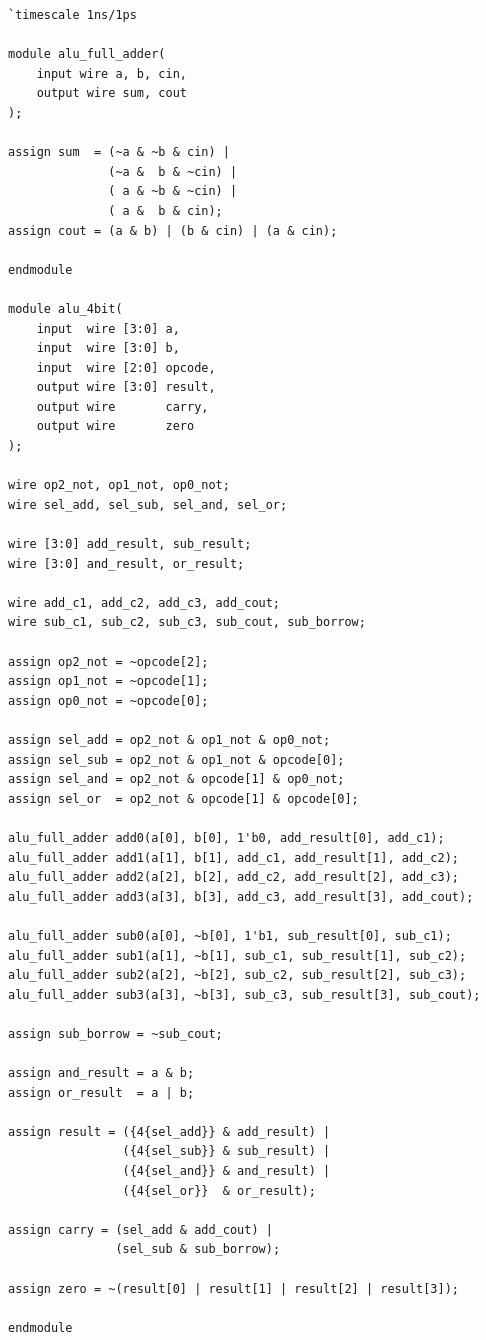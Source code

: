 \documentclass[11pt,a4paper]{article}
\begin{document}
\begin{lstlisting}[caption={Gate-level 4-bit ALU design}]
`timescale 1ns/1ps

module alu_full_adder(
    input wire a, b, cin,
    output wire sum, cout
);

assign sum  = (~a & ~b & cin) |
              (~a &  b & ~cin) |
              ( a & ~b & ~cin) |
              ( a &  b & cin);
assign cout = (a & b) | (b & cin) | (a & cin);

endmodule

module alu_4bit(
    input  wire [3:0] a,
    input  wire [3:0] b,
    input  wire [2:0] opcode,
    output wire [3:0] result,
    output wire       carry,
    output wire       zero
);

wire op2_not, op1_not, op0_not;
wire sel_add, sel_sub, sel_and, sel_or;

wire [3:0] add_result, sub_result;
wire [3:0] and_result, or_result;

wire add_c1, add_c2, add_c3, add_cout;
wire sub_c1, sub_c2, sub_c3, sub_cout, sub_borrow;

assign op2_not = ~opcode[2];
assign op1_not = ~opcode[1];
assign op0_not = ~opcode[0];

assign sel_add = op2_not & op1_not & op0_not;
assign sel_sub = op2_not & op1_not & opcode[0];
assign sel_and = op2_not & opcode[1] & op0_not;
assign sel_or  = op2_not & opcode[1] & opcode[0];

alu_full_adder add0(a[0], b[0], 1'b0, add_result[0], add_c1);
alu_full_adder add1(a[1], b[1], add_c1, add_result[1], add_c2);
alu_full_adder add2(a[2], b[2], add_c2, add_result[2], add_c3);
alu_full_adder add3(a[3], b[3], add_c3, add_result[3], add_cout);

alu_full_adder sub0(a[0], ~b[0], 1'b1, sub_result[0], sub_c1);
alu_full_adder sub1(a[1], ~b[1], sub_c1, sub_result[1], sub_c2);
alu_full_adder sub2(a[2], ~b[2], sub_c2, sub_result[2], sub_c3);
alu_full_adder sub3(a[3], ~b[3], sub_c3, sub_result[3], sub_cout);

assign sub_borrow = ~sub_cout;

assign and_result = a & b;
assign or_result  = a | b;

assign result = ({4{sel_add}} & add_result) |
                ({4{sel_sub}} & sub_result) |
                ({4{sel_and}} & and_result) |
                ({4{sel_or}}  & or_result);

assign carry = (sel_add & add_cout) |
               (sel_sub & sub_borrow);

assign zero = ~(result[0] | result[1] | result[2] | result[3]);

endmodule
\end{lstlisting}
\end{document}
